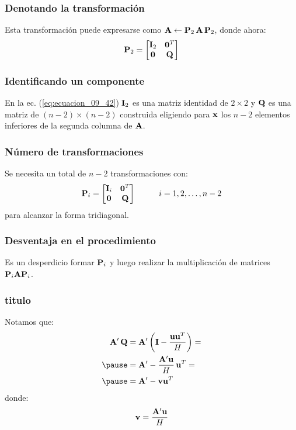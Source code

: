 \documentclass[12pt]{beamer}
\begin{document}
\begin{frame}
\frametitle{Denotando la transformación}
Esta transformación puede expresarse como $\vb{A} \leftarrow \vb{P}_{2} \, \vb{A} \, \vb{P}_{2}$, donde ahora:
\pause
\begin{align}
\vb{P}_{2} =
\begin{bmatrix}
\vb{I}_{2} & \vb{0}^{T} \\
\vb{0} & \vb{Q}
\end{bmatrix}
\label{eq:ecuacion_09_42}
\end{align}
\end{frame}
\begin{frame}
\frametitle{Identificando un componente}
En la ec. (\ref{eq:ecuacion_09_42}) $\vb{I}_{2}$ es una matriz identidad de $2 \times 2$ y $\vb{Q}$ es una matriz de $(n - 2) \times (n - 2)$ construida eligiendo para $\vb{x}$ los $n - 2$ elementos inferiores de la segunda columna de $\vb{A}$.
\end{frame}
\begin{frame}
\frametitle{Número de transformaciones}
Se necesita un total de $n - 2$ transformaciones con:
\pause
\begin{align*}
\vb{P}_{i} =
\begin{bmatrix}
\vb{I}_{i} & \vb{0}^{T} \\
\vb{0} & \vb{Q}
\end{bmatrix} \hspace{1cm} i = 1, 2, \ldots, n - 2
\end{align*}
para alcanzar la forma tridiagonal.
\end{frame}
\begin{frame}
\frametitle{Desventaja en el procedimiento}
Es un desperdicio formar $\vb{P}_{i}$ y luego realizar la multiplicación de matrices $\vb{P}_{i} \vb{A} \vb{P}_{i}$.
\end{frame}
\begin{frame}
\frametitle{titulo}
Notamos que:
\pause
\begin{eqnarray*}
\begin{aligned}
\pderivada{\vb{A}} \, \vb{Q} &= \pderivada{\vb{A}} \left( \vb{I} - \dfrac{\vb{u} \vb{u}^{T}}{H} \right) = \\ \pause
&= \pderivada{\vb{A}} - \dfrac{\pderivada{\vb{A}} \vb{u}}{H} \, \vb{u}^{T} = \\ \pause
&= \pderivada{\vb{A}} - \vb{v} \vb{u}^{T}
\end{aligned}
\end{eqnarray*}
\pause
donde:
\begin{align}
\vb{v} = \dfrac{{\vb{A}}^{\prime} \vb{u}}{H}
\label{eq:ecuacion_09_43}
\end{align}
\end{frame}
\end{document}
